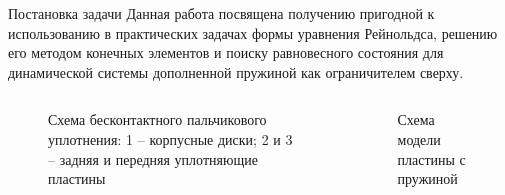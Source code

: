 \documentclass[ignoreonframetext,unicode]{beamer}
\begin{document}
	\begin{frame}{Постановка задачи}
		Данная работа посвящена получению пригодной к использованию в практических задачах формы уравнения Рейнольдса, решению его методом конечных элементов и поиску равновесного состояния для динамической системы дополненной пружиной как ограничителем сверху.
		
			\begin{columns}
	\begin{figure}[!htbp]
	\caption{Схема бесконтактного пальчикового уплотнения: 1 – корпусные
		диски; 2 и 3 – задняя и передняя уплотняющие пластины}
	\label{vved-2}
	\end{figure}
		
	\begin{figure}[!htbp]
		\caption{Схема модели пластины с пружиной}
		\label{pruzina}
	\end{figure}
	\end{columns}	
		
	\end{frame}
\end{document}
